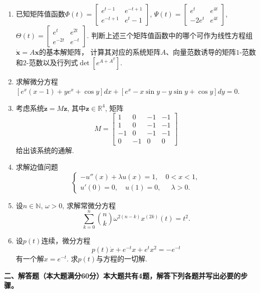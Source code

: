 \begin{enumerate}
    \item 已知矩阵值函数$\Phi(t)=\begin{bmatrix}e^{t-1} & e^{-t+1} \\ e^{-t+1} & e^t - 1\end{bmatrix}$, 
    $\Psi (t) = \begin{bmatrix} e^t & e^{4t} \\ -2 e ^t & e^{4t}\end{bmatrix}$, $\Theta(t) = \begin{bmatrix} e^t & e^{2t} \\ e^{-2t} & e^{-t}\end{bmatrix}$. 
    判断上述三个矩阵值函数中的哪个可作为线性方程组$\dot{\boldsymbol{x}}=A\boldsymbol{x}$的基本解矩阵，
    计算其对应的系统矩阵$A$、向量范数诱导的矩阵$1$-范数和$2$-范数以及行列式$\det[e^{A+A^T}]$.
    \item 求解微分方程$[e^x(x-1)+ye^x+\cos y]dx+[e^x-x\sin y -y\sin y +\cos y ] dy=0$.
    \item 考虑系统$\dot{\boldsymbol{z}}=M\boldsymbol{z}$, 其中$\boldsymbol{z}\in \mathbb{R}^4$, 矩阵$$
        M=\begin{bmatrix}1 & 0 & -1 & -1 \\ 1 & 0 & -1 & -1 \\ -1 & 0 & -1 & -1 \\ 0 & -1 & 0 & 0\end{bmatrix}
    $$给出该系统的通解.
    \item 求解边值问题
    $$\begin{cases}
        -u''(x)+\lambda u(x)=1 ,\quad  0< x <1, \\
        u'(0)=0,\quad u(1)=0, \quad\ \ \lambda>0.
    \end{cases}$$
    \item 设$n\in \mathbb{N}$, $\omega > 0$, 求解常微分方程
    \[
        \sum_{k=0}^n \binom{n}{k}\omega^{2(n-k)}x^{(2k)}(t)=t^2.
    \]
    \item 设$p(t)$连续，微分方程
    \[
        p(t)\dot{x}+e^{-t}x+e^{t}x^2=-e^{-t}
    \]
    有一个解$x=e^{-t}$. 求$p(t)$与方程的一切解.
\end{enumerate}

\textbf{二、解答题（本大题满分60分）本大题共有4题，解答下列各题并写出必要的步骤。}

